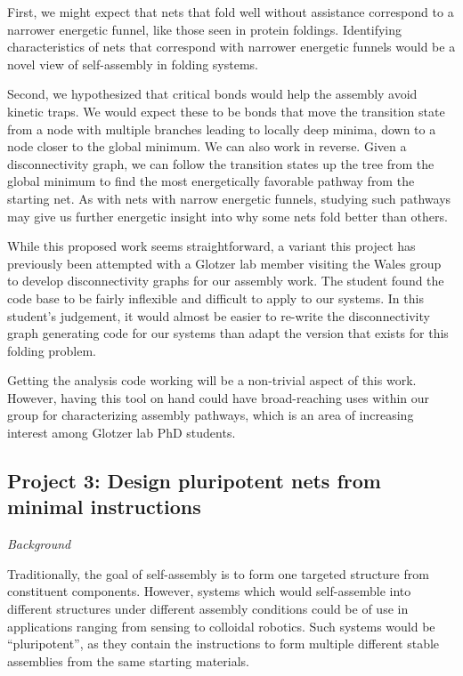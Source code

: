 First, we might expect that nets that fold well without assistance correspond to a narrower energetic funnel, like those seen in protein foldings.
Identifying characteristics of nets that correspond with narrower energetic funnels would be a novel view of self-assembly in folding systems.

Second, we hypothesized that critical bonds would help the assembly avoid kinetic traps.
We would expect these to be bonds that move the transition state from a node with multiple branches leading to locally deep minima, down to a node closer to the global minimum.
We can also work in reverse.
Given a disconnectivity graph, we can follow the transition states up the tree from the global minimum to find the most energetically favorable pathway from the starting net.
As with nets with narrow energetic funnels, studying such pathways may give us further energetic insight into why some nets fold better than others.

While this proposed work seems straightforward, a variant this project has previously been attempted with a Glotzer lab member visiting the Wales group to develop disconnectivity graphs for our assembly work.
The student found the code base to be fairly inflexible and difficult to apply to our systems.
In this student's judgement, it would almost be easier to re-write the disconnectivity graph generating code for our systems than adapt the version that exists for this folding problem.

Getting the analysis code working will be a non-trivial aspect of this work.
However, having this tool on hand could have broad-reaching uses within our group for characterizing assembly pathways, which is an area of increasing interest among Glotzer lab PhD students.



\subsection*{Project 3: Design pluripotent nets from minimal instructions}

\textit{Background}

Traditionally, the goal of self-assembly is to form one targeted structure from constituent components.
However, systems which would self-assemble into different structures under different assembly conditions could be of use in applications ranging from sensing to colloidal robotics.
Such systems would be ``pluripotent'', as they contain the instructions to form multiple different stable assemblies from the same starting materials.

